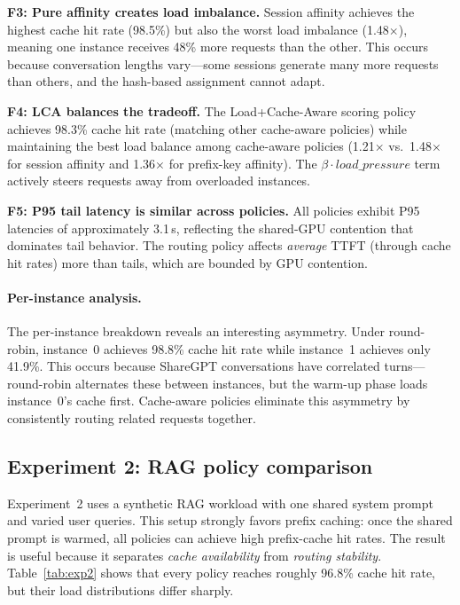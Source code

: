 \documentclass{article}
\begin{document}
\textbf{F3: Pure affinity creates load imbalance.} Session affinity achieves the highest cache hit rate (98.5\%) but also the worst load imbalance (1.48$\times$), meaning one instance receives 48\% more requests than the other. This occurs because conversation lengths vary---some sessions generate many more requests than others, and the hash-based assignment cannot adapt.

\textbf{F4: LCA balances the tradeoff.} The Load+Cache-Aware scoring policy achieves 98.3\% cache hit rate (matching other cache-aware policies) while maintaining the best load balance among cache-aware policies (1.21$\times$ vs.\ 1.48$\times$ for session affinity and 1.36$\times$ for prefix-key affinity). The $\beta \cdot \textit{load\_pressure}$ term actively steers requests away from overloaded instances.

\textbf{F5: P95 tail latency is similar across policies.} All policies exhibit P95 latencies of approximately 3.1\,s, reflecting the shared-GPU contention that dominates tail behavior. The routing policy affects \emph{average} TTFT (through cache hit rates) more than tails, which are bounded by GPU contention.

\paragraph{Per-instance analysis.}
The per-instance breakdown reveals an interesting asymmetry. Under round-robin, instance~0 achieves 98.8\% cache hit rate while instance~1 achieves only 41.9\%. This occurs because ShareGPT conversations have correlated turns---round-robin alternates these between instances, but the warm-up phase loads instance~0's cache first. Cache-aware policies eliminate this asymmetry by consistently routing related requests together.

\subsection{Experiment 2: RAG policy comparison}
\label{sec:eval_rag}

Experiment~2 uses a synthetic RAG workload with one shared system prompt and varied user queries. This setup strongly favors prefix caching: once the shared prompt is warmed, all policies can achieve high prefix-cache hit rates. The result is useful because it separates \emph{cache availability} from \emph{routing stability}. Table~\ref{tab:exp2} shows that every policy reaches roughly 96.8\% cache hit rate, but their load distributions differ sharply.
\end{document}
